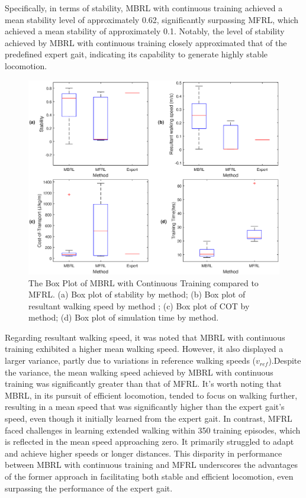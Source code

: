 Specifically, in terms of stability, MBRL with continuous training achieved a mean stability level of approximately 0.62, significantly surpassing MFRL, which achieved a mean stability of approximately 0.1. Notably, the level of stability achieved by MBRL with continuous training closely approximated that of the predefined expert gait, indicating its capability to generate highly stable locomotion. 
\begin{figure}[htb]
    \centering
    \includegraphics[width=\linewidth]{img/chap5/box_results.eps}
    \caption{The Box Plot of MBRL with Continuous Training compared to MFRL. (a) Box plot of stability by method; (b) Box plot of resultant walking speed by method ; (c) Box plot of COT by method; (d) Box plot of simulation time by method.}
    \label{fig:box}
\end{figure}

Regarding resultant walking speed, it was noted that MBRL with continuous training exhibited a higher mean walking speed. However, it also displayed a larger variance, partly due to variations in reference walking speeds ($v_{ref}$).Despite the variance, the mean walking speed achieved by MBRL with continuous training was significantly greater than that of MFRL. It's worth noting that MBRL, in its pursuit of efficient locomotion, tended to focus on walking further, resulting in a mean speed that was significantly higher than the expert gait's speed, even though it initially learned from the expert gait. In contrast, MFRL faced challenges in learning extended walking within 350 training episodes, which is reflected in the mean speed approaching zero. It primarily struggled to adapt and achieve higher speeds or longer distances. This disparity in performance between MBRL with continuous training and MFRL underscores the advantages of the former approach in facilitating both stable and efficient locomotion, even surpassing the performance of the expert gait. 

